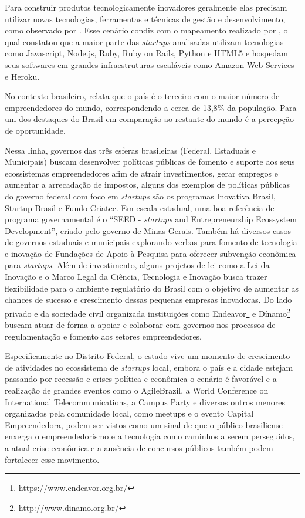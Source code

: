 Para construir produtos tecnologicamente inovadores geralmente elas precisam utilizar novas tecnologias, ferramentas e técnicas de gestão e desenvolvimento, como observado por . Esse cenário condiz com o mapeamento realizado por , o qual constatou que a maior parte das \textit{startups} analisadas utilizam tecnologias como Javascript, Node.js, Ruby, Ruby on Rails, Python e HTML5 e hospedam seus softwares em grandes infraestruturas escaláveis como Amazon Web Services e Heroku. 

No contexto brasileiro,  relata que o país é o terceiro com o maior número de empreendedores do mundo, correspondendo a cerca de 13,8\% da população. Para  um dos destaques do Brasil em comparação ao restante do mundo é a percepção de oportunidade.

Nessa linha, governos das três esferas brasileiras (Federal, Estaduais e Municipais) buscam desenvolver políticas públicas de fomento e suporte aos seus ecossistemas empreendedores afim de atrair investimentos, gerar empregos e aumentar a arrecadação de impostos, alguns dos exemplos de políticas públicas do governo federal com foco em \textit{startups} são os programas Inovativa Brasil, Startup Brasil e Fundo Criatec. Em escala estadual, uma boa referência de programa governamental é o ``SEED - \textit{startups} and Entrepreneurship Ecossystem Development'', criado pelo governo de Minas Gerais. Também há diversos casos de governos estaduais e municipais explorando verbas para fomento de tecnologia e inovação de Fundações de Apoio à Pesquisa para oferecer subvenção econômica para \textit{startups}. Além de investimento, alguns projetos de lei como a Lei da Inovação e o Marco Legal da Ciência, Tecnologia e Inovação busca trazer flexibilidade para o ambiente regulatório do Brasil com o objetivo de aumentar as chances de sucesso e crescimento dessas pequenas empresas inovadoras. Do lado privado e da sociedade civil organizada instituições como Endeavor\footnote{https://www.endeavor.org.br/} e Dínamo\footnote{http://www.dinamo.org.br/} buscam atuar de forma a apoiar e colaborar com governos nos processos de regulamentação e fomento aos setores empreendedores.

Especificamente no Distrito Federal, o estado vive um momento de crescimento de atividades no ecossistema de \textit{startups} local, embora o país e a cidade estejam passando por recessão e crises política e econômica o cenário é favorável e a realização de grandes eventos como o AgileBrazil, a World Conference on International Telecommunications, a Campus Party e diversos outros menores organizados pela comunidade local, como meetups e o evento Capital Empreendedora, podem ser vistos como um sinal de que o público brasiliense enxerga o empreendedorismo e a tecnologia como caminhos a serem perseguidos, a atual crise econômica e a ausência de concursos públicos também podem fortalecer esse movimento.

